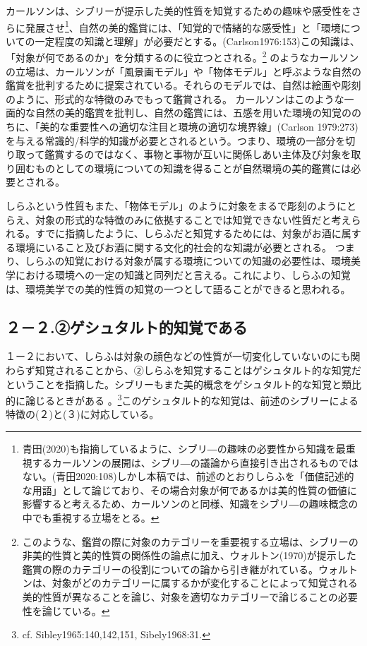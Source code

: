 \documentclass[b5j,twoside,twocolumn]{utarticle}
\begin{document}
{カールソンは、シブリーが提示した美的性質を知覚するための趣味や感受性をさらに発展させ\footnote{青田(2020)も指摘しているように、シブリ―の趣味の必要性から知識を最重視するカールソンの展開は、シブリ―の議論から直接引き出されるものではない。(青田2020:108)しかし本稿では、前述のとおりしらふを「価値記述的な用語」として論じており、その場合対象が何であるかは美的性質の価値に影響すると考えるため、カールソンのと同様、知識をシブリ―の趣味概念の中でも重視する立場をとる。}、自然の美的鑑賞には、「知覚的で情緒的な感受性」と「環境についての一定程度の知識と理解」が必要だとする。(Carlson1976:153)この知識は、「対象が何であるのか」を分類するのに役立つとされる。\footnote{このような、鑑賞の際に対象のカテゴリーを重要視する立場は、シブリーの非美的性質と美的性質の関係性の論点に加え、ウォルトン(1970)が提示した鑑賞の際のカテゴリーの役割についての論から引き継がれている。ウォルトンは、対象がどのカテゴリーに属するかが変化することによって知覚される美的性質が異なることを論じ、対象を適切なカテゴリーで論じることの必要性を論じている。}
のようなカールソンの立場は、カールソンが「風景画モデル」や「物体モデル」と呼ぶような自然の鑑賞を批判するために提案されている。それらのモデルでは、自然は絵画や彫刻のように、形式的な特徴のみでもって鑑賞される。 カールソンはこのような一面的な自然の美的鑑賞を批判し、自然の鑑賞には、五感を用いた環境の知覚ののちに、「美的な重要性への適切な注目と環境の適切な境界線」(Carlson 1979:273)を与える常識的/科学的知識が必要とされるという。つまり、環境の一部分を切り取って鑑賞するのではなく、事物と事物が互いに関係しあい主体及び対象を取り囲むものとしての環境についての知識を得ることが自然環境の美的鑑賞には必要とされる。

しらふという性質もまた、「物体モデル」のように対象をまるで彫刻のようにとらえ、対象の形式的な特徴のみに依拠することでは知覚できない性質だと考えられる。すでに指摘したように、しらふだと知覚するためには、対象がお酒に属する環境にいること及びお酒に関する文化的社会的な知識が必要とされる。 つまり、しらふの知覚における対象が属する環境についての知識の必要性は、環境美学における環境への一定の知識と同列だと言える。これにより、しらふの知覚は、環境美学での美的性質の知覚の一つとして語ることができると思われる。

\subsection{２－２.②ゲシュタルト的知覚である}

１ー２において、しらふは対象の顔色などの性質が一切変化していないのにも関わらず知覚されることから、②しらふを知覚することはゲシュタルト的な知覚だということを指摘した。シブリーもまた美的概念をゲシュタルト的な知覚と類比的に論じるときがある 。\footnote{cf. Sibley1965:140,142,151, Sibely1968:31.}このゲシュタルト的な知覚は、前述のシブリーによる特徴の(２)と(３)に対応している。

}
\end{document}

